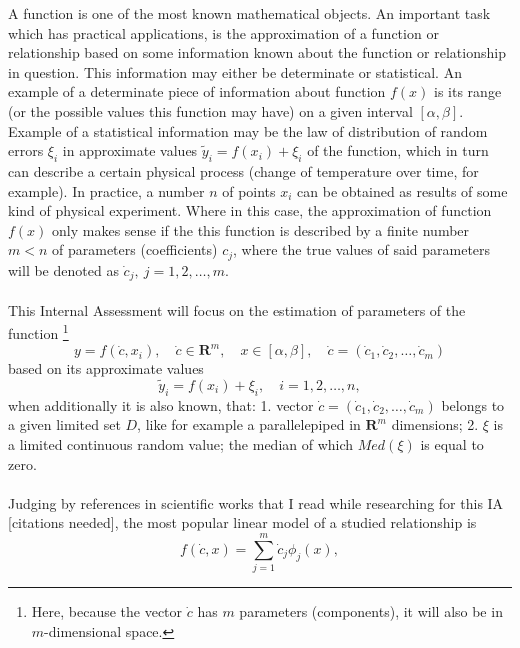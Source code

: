 A function is one of the most known mathematical objects. An important task which has practical applications, is the approximation of a function or relationship based on some information known about the function or relationship in question. This information may either be determinate or statistical. An example of a determinate piece of information about function $f(x)$ is its range (or the possible values this function may have) on a given interval $[\alpha,\beta]$. Example of a statistical information may be the law of distribution of random errors $\xi_{i}$ in approximate values $\tilde{y}_{i} = f(x_{i})+\xi_{i}$ of the function, which in turn can describe a certain physical process (change of temperature over time, for example). In practice, a number $n$ of points $x_{i}$ can be obtained as results of some kind of physical experiment. Where in this case, the approximation of function $f(x)$ only makes sense if the this function is described by a finite number $m<n$ of parameters (coefficients) $c_{j}$, where the true values of said parameters will be denoted as $\dot{c}_{j}, \ j=1,2,\dots,m.$ \\
\\
This Internal Assessment will focus on the estimation of parameters of the function \footnote{Here, because the vector $\dot{c}$ has $m$ parameters (components), it will also be in $m$-dimensional space.}
\begin{equation}
y = f(\dot{c},x_{i}),\quad \dot{c} \in \boldsymbol{R}^{m},\quad x \in [\alpha,\beta],\quad \dot{c} = (\dot{c}_{1}, \dot{c}_{2},\dots,\dot{c}_{m}) \label{301}
\end{equation}
based on its approximate values
\begin{equation}
\tilde{y}_{i} = f(x_{i})+\xi_{i}, \quad i=1,2,\dots,n ,
\end{equation}
when additionally it is also known, that: 1. vector $\dot{c} = (\dot{c}_{1}, \dot{c}_{2},\dots,\dot{c}_{m})$ belongs to a given limited set $D$, like for example a parallelepiped in $\boldsymbol{R}^{m}$ dimensions; 2. $\xi$ is a limited continuous random value; the median of which $Med(\xi)$ is equal to zero. \\
\\
Judging by references in scientific works that I read while researching for this IA [citations needed], the most popular linear model of a studied relationship is
\begin{equation}
f(\dot{c},x)= \sum\limits_{j=1}^{m} \dot{c}_{j} \phi_{j}(x), \label{functionform}
\end{equation}
